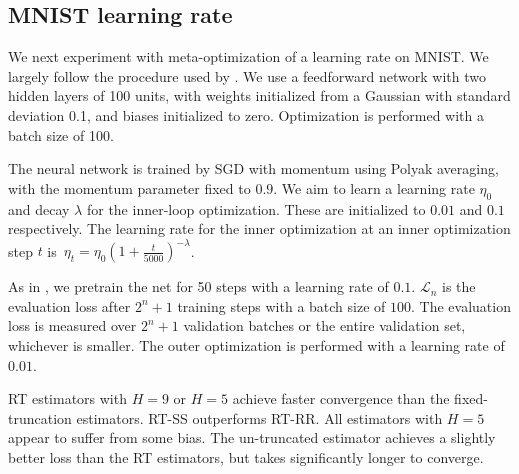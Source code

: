 \subsection{MNIST learning rate}
We next experiment with meta-optimization of a learning rate on MNIST.
We largely follow the procedure used by \cite{wu2018understanding}.
We use a feedforward network with two hidden layers of 100 units, with weights initialized from a Gaussian with standard deviation 0.1, and biases initialized to zero.
Optimization is performed with a batch size of 100.

The neural network is trained by SGD with momentum using Polyak averaging, with the momentum parameter fixed to $0.9$.
We aim to learn a learning rate $\eta_0$ and decay $\lambda$ for the inner-loop optimization.
These are initialized to $0.01$ and $0.1$ respectively.
The learning rate for the inner optimization at an inner optimization step $t$ is~$
{\eta_t = \eta_0(1 + \frac{t}{5000})^{-\lambda}}$.

As in \cite{wu2018understanding}, we pretrain the net for 50 steps with a learning rate of $0.1$.
$\mathcal{L}_n$ is the evaluation loss after $2^n + 1$ training steps with a batch size of $100$.
The evaluation loss is measured over $2^n + 1$ validation batches or the entire validation set, whichever is smaller.
The outer optimization is performed with a learning rate of $0.01$.

RT estimators with $H = 9$ or $H = 5$ achieve faster convergence than the fixed-truncation estimators.
RT-SS outperforms RT-RR.
All estimators with $H = 5$ appear to suffer from some bias.
The un-truncated estimator achieves a slightly better loss than the RT estimators, but takes significantly longer to converge.


